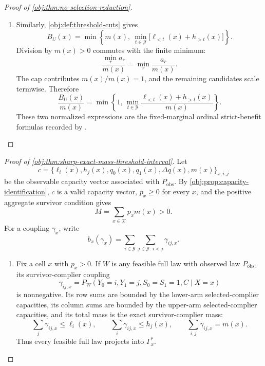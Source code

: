 \begin{proof}[Proof of \cref{obj:thm:no-selection-reduction}]
\begin{enumerate}
\item
Similarly, \cref{obj:def:threshold-cuts} gives
\[
B_U(x)
=
\min\left\{
m(x),\
\min_{t\in\mathcal Y}\bigl[\ell_{<t}(x)+h_{>t}(x)\bigr]
\right\}.
\]
Division by \(m(x)>0\) commutes with the finite minimum:
\[
\frac{\min_r a_r}{m(x)}
=
\min_r \frac{a_r}{m(x)}.
\]
The cap contributes \(m(x)/m(x)=1\), and the remaining candidates scale termwise.  Therefore
\[
\frac{B_U(x)}{m(x)}
=
\min\left\{
1,\,
\min_{t\in\mathcal Y}
\frac{\ell_{<t}(x)+h_{>t}(x)}{m(x)}
\right\}.
\]
These two normalized expressions are the fixed-marginal ordinal strict-benefit formulas recorded by \citep[Proposition 2, equation (6), p.~546]{LuDingDasgupta2018}.
\end{enumerate}
\end{proof}

\begin{proof}[Proof of \cref{obj:thm:sharp-exact-mass-threshold-interval}]
Let
\[
c=\{\ell_i(x),h_j(x),q_0(x),q_1(x),\Delta q(x),m(x)\}_{x,i,j}
\]
be the observable capacity vector associated with \(P_{\mathrm{obs}}\).  By
\cref{obj:prop:capacity-identification}, \(c\) is a valid capacity vector,
\(p_x\ge 0\) for every \(x\), and the positive aggregate survivor condition gives
\[
M=\sum_{x\in\mathcal X}p_xm(x)>0 .
\]
For a coupling \(\gamma_x\), write
\[
b_x(\gamma_x)=\sum_{i\in\mathcal Y}\sum_{j\in\mathcal Y:\,i<j}\gamma_{ij,x}.
\]

\begin{enumerate}
\item Fix a cell \(x\) with \(p_x>0\).  If \(W\) is any feasible full law with observed law \(P_{\mathrm{obs}}\), its survivor-complier coupling
\[
\gamma_{ij,x}
=
P_W(Y_0=i,Y_1=j,S_0=S_1=1,C\mid X=x)
\]
is nonnegative.  Its row sums are bounded by the lower-arm selected-complier capacities, its column sums are bounded by the upper-arm selected-complier capacities, and its total mass is the exact survivor-complier mass:
\[
\sum_j\gamma_{ij,x}\le \ell_i(x),\qquad
\sum_i\gamma_{ij,x}\le h_j(x),\qquad
\sum_{i,j}\gamma_{ij,x}=m(x).
\]
Thus every feasible full law projects into \(\Gamma_x^\ast\).


\end{enumerate}
\end{proof}
